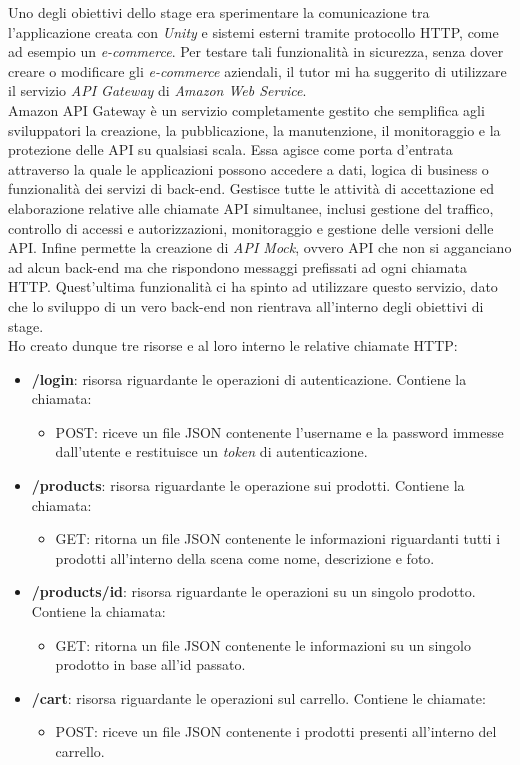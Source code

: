 Uno degli obiettivi dello stage era sperimentare la comunicazione tra l'applicazione creata con \textit{Unity} e sistemi esterni tramite protocollo HTTP, come ad esempio un \textit{e-commerce}. Per testare tali funzionalità in sicurezza, senza dover creare o modificare gli \textit{e-commerce} aziendali, il tutor mi ha suggerito di utilizzare il servizio \textit{API Gateway} di \textit{Amazon Web Service}. \\ 
Amazon API Gateway è un servizio completamente gestito che semplifica agli sviluppatori la creazione, la pubblicazione, la manutenzione, il monitoraggio e la protezione delle API su qualsiasi scala. Essa agisce come porta d'entrata attraverso la quale le applicazioni possono accedere a dati, logica di business o funzionalità dei servizi di back-end. Gestisce tutte le attività di accettazione ed elaborazione relative alle chiamate API simultanee, inclusi gestione del traffico, controllo di accessi e autorizzazioni, monitoraggio e gestione delle versioni delle API. Infine permette la creazione di \textit{API Mock}, ovvero API che non si agganciano ad alcun back-end ma che rispondono messaggi prefissati ad ogni chiamata HTTP. Quest'ultima funzionalità ci ha spinto ad utilizzare questo servizio, dato che lo sviluppo di un vero back-end non rientrava all'interno degli obiettivi di stage. \\
Ho creato dunque tre risorse e al loro interno le relative chiamate HTTP:
\begin{itemize}
	\item \textbf{/login}: risorsa riguardante le operazioni di autenticazione. Contiene la chiamata:
	\begin{itemize}
		\item POST: riceve un file JSON contenente l'username e la password immesse dall'utente e restituisce un \textit{token} di autenticazione.
	\end{itemize}
	\item \textbf{/products}: risorsa riguardante le operazione sui prodotti. Contiene la chiamata:
	\begin{itemize}
		\item GET: ritorna un file JSON contenente le informazioni riguardanti tutti i prodotti all'interno della scena come nome, descrizione e foto.
	\end{itemize}
	\item \textbf{/products/{id}}: risorsa riguardante le operazioni su un singolo prodotto. Contiene la chiamata:
	\begin{itemize}
		\item GET: ritorna un file JSON contenente le informazioni su un singolo prodotto in base all'id passato. 
	\end{itemize}
	\item \textbf{/cart}: risorsa riguardante le operazioni sul carrello. Contiene le chiamate:
	\begin{itemize}
		\item POST: riceve un file JSON contenente i prodotti presenti all'interno del carrello.
	\end{itemize} 
\end{itemize}

